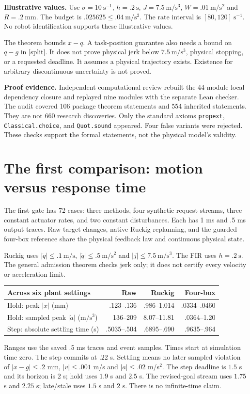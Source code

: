 \documentclass[11pt,letterpaper]{article}
\begin{document}
\textbf{Illustrative values.} Use $\sigma=10\ \mathrm{s}^{-1}$, $h=.2\ \mathrm{s}$, $J=7.5\ \mathrm{m/s^3}$, $W=.01\ \mathrm{m/s^2}$ and $R=.2\ \mathrm{mm}$. The budget is $.025625\leq.04\ \mathrm{m/s^2}$. The rate interval is $[80,120]\ \mathrm{s}^{-1}$. No robot identification supports these illustrative values.

The theorem bounds $x-q$. A task-position guarantee also needs a bound on $q-g$ in \eqref{split}. It does not prove physical jerk below $7.5\ \mathrm{m/s^3}$, physical stopping, or a requested deadline. It assumes a physical trajectory exists. Existence for arbitrary discontinuous uncertainty is not proved.

\textbf{Proof evidence.} Independent computational review rebuilt the 44-module local dependency closure and replayed nine modules with the separate Lean checker. The audit covered 106 package theorem statements and 554 inherited statements. They are not 660 research discoveries. Only the standard axioms \texttt{propext}, \texttt{Classical.choice}, and \texttt{Quot.sound} appeared. Four false variants were rejected. These checks support the formal statements, not the physical model's validity.

\newpage
\section{The first comparison: motion versus response time}
The first gate has 72 cases: three methods, four synthetic request streams, three constant actuator rates, and two constant disturbances. Each has 1 ms and .5 ms output traces. Raw target changes, native Ruckig replanning, and the guarded four-box reference share the physical feedback law and continuous physical state.

Ruckig uses $|\dot q|\leq.1\ \mathrm{m/s}$, $|\ddot q|\leq.5\ \mathrm{m/s^2}$ and $|j|\leq7.5\ \mathrm{m/s^3}$. The FIR uses $h=.2\ \mathrm{s}$. The general admission theorem checks jerk only; it does not certify every velocity or acceleration limit.

\begin{center}\small
\begin{tabular}{lrrr}
\toprule
Across six plant settings & Raw & Ruckig & Four-box\\
\midrule
Hold: peak $|x|$ (mm) & .123--.136 & .986--1.014 & .0334--.0460\\
Hold: sampled peak $|\dot a|$ ($\mathrm{m/s^3}$) & 136--209 & 8.07--11.81 & .0364--1.20\\
Step: absolute settling time (s) & .5035--.504 & .6895--.690 & .9635--.964\\
\bottomrule
\end{tabular}
\end{center}
Ranges use the saved .5 ms traces and event samples. Times start at simulation time zero. The step commits at $.22$ s. Settling means no later sampled violation of $|x-g|\leq.2$ mm, $|v|\leq.001$ m/s and $|a|\leq.02$ m/s$^2$. The step deadline is $1.5$ s and its horizon is $2$ s; hold uses $1.9$ s and $2.5$ s. The revised-goal stream uses $1.75$ s and $2.25$ s; late/stale uses $1.5$ s and $2$ s. There is no infinite-time claim.
\end{document}
